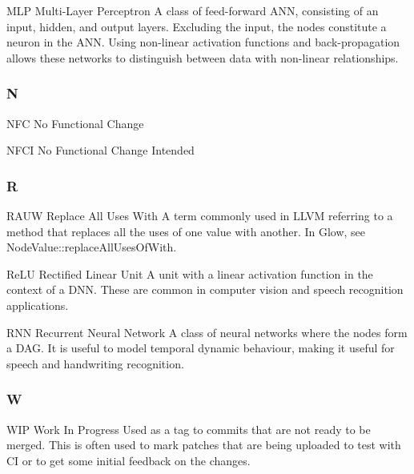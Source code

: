 \begin{DoxyItemize}
\item M\+LP Multi-\/\+Layer Perceptron A class of feed-\/forward A\+NN, consisting of an input, hidden, and output layers. Excluding the input, the nodes constitute a neuron in the A\+NN. Using non-\/linear activation functions and back-\/propagation allows these networks to distinguish between data with non-\/linear relationships.
\end{DoxyItemize}

\subsubsection*{N}


\begin{DoxyItemize}
\item N\+FC No Functional Change
\item N\+F\+CI No Functional Change Intended
\end{DoxyItemize}

\subsubsection*{R}


\begin{DoxyItemize}
\item R\+A\+UW Replace All Uses With A term commonly used in L\+L\+VM referring to a method that replaces all the uses of one value with another. In Glow, see {\ttfamily Node\+Value\+::replace\+All\+Uses\+Of\+With}.
\item Re\+LU Rectified Linear Unit A unit with a linear activation function in the context of a D\+NN. These are common in computer vision and speech recognition applications.
\item R\+NN Recurrent Neural Network A class of neural networks where the nodes form a D\+AG. It is useful to model temporal dynamic behaviour, making it useful for speech and handwriting recognition.
\end{DoxyItemize}

\subsubsection*{W}


\begin{DoxyItemize}
\item W\+IP Work In Progress Used as a tag to commits that are not ready to be merged. This is often used to mark patches that are being uploaded to test with CI or to get some initial feedback on the changes. 
\end{DoxyItemize}